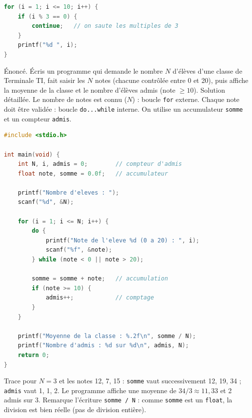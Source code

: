 \documentclass[11pt]{article}
\begin{document}
\begin{lstlisting}[language=C]
for (i = 1; i <= 10; i++) {
    if (i % 3 == 0) {
        continue;   // on saute les multiples de 3
    }
    printf("%d ", i);
}
\end{lstlisting}

\begin{exoresolu}
Énoncé. Écris un programme qui demande le nombre $N$ d'élèves d'une classe de Terminale TI, fait saisir les $N$ notes (chacune contrôlée entre 0 et 20), puis affiche la moyenne de la classe et le nombre d'élèves admis (note $\geq 10$).
\tcblower
Solution détaillée. Le nombre de notes est connu ($N$) : boucle \texttt{for} externe. Chaque note doit être validée : boucle \texttt{do...while} interne. On utilise un accumulateur \texttt{somme} et un compteur \texttt{admis}.
\begin{lstlisting}[language=C]
#include <stdio.h>

int main(void) {
    int N, i, admis = 0;        // compteur d'admis
    float note, somme = 0.0f;   // accumulateur

    printf("Nombre d'eleves : ");
    scanf("%d", &N);

    for (i = 1; i <= N; i++) {
        do {
            printf("Note de l'eleve %d (0 a 20) : ", i);
            scanf("%f", &note);
        } while (note < 0 || note > 20);

        somme = somme + note;   // accumulation
        if (note >= 10) {
            admis++;            // comptage
        }
    }

    printf("Moyenne de la classe : %.2f\n", somme / N);
    printf("Nombre d'admis : %d sur %d\n", admis, N);
    return 0;
}
\end{lstlisting}
Trace pour $N = 3$ et les notes 12, 7, 15 : \texttt{somme} vaut successivement 12, 19, 34 ; \texttt{admis} vaut 1, 1, 2. Le programme affiche une moyenne de $34/3 \approx 11,33$ et 2 admis sur 3. Remarque l'écriture \texttt{somme / N} : comme \texttt{somme} est un \texttt{float}, la division est bien réelle (pas de division entière).
\end{exoresolu}
\end{document}
